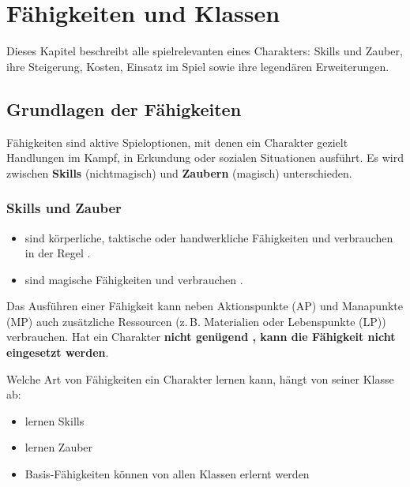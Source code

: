 \chapter{Fähigkeiten und Klassen}

Dieses Kapitel beschreibt alle spielrelevanten  eines Charakters:
Skills und Zauber, ihre Steigerung, Kosten, Einsatz im Spiel sowie ihre
legendären Erweiterungen.

\section{Grundlagen der Fähigkeiten}

Fähigkeiten sind aktive Spieloptionen, mit denen ein Charakter gezielt
Handlungen im Kampf, in Erkundung oder sozialen Situationen ausführt.
Es wird zwischen \textbf{Skills} (nichtmagisch) und \textbf{Zaubern} (magisch) unterschieden.

\subsection*{Skills und Zauber}

\begin{itemize}
	\item {} sind körperliche, taktische oder handwerkliche Fähigkeiten
	und verbrauchen in der Regel \textbf{}.
	\item {} sind magische Fähigkeiten und verbrauchen
	\textbf{}.
\end{itemize}

Das Ausführen einer Fähigkeit kann neben Aktionspunkte (AP) und Manapunkte (MP) auch zusätzliche Ressourcen (z.\,B. Materialien oder Lebenspunkte (LP)) verbrauchen. Hat ein Charakter \textbf{nicht genügend , kann die Fähigkeit nicht eingesetzt werden}.

Welche Art von Fähigkeiten ein Charakter lernen kann, hängt von seiner Klasse ab:
\begin{itemize}
	\item {} lernen Skills
	\item {} lernen Zauber
	\item Basis-Fähigkeiten können von allen Klassen erlernt werden
\end{itemize}

